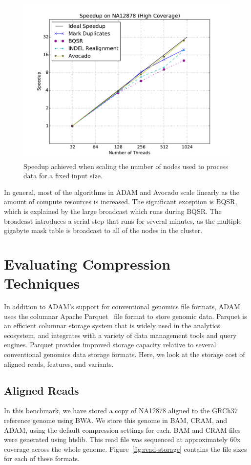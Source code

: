 \documentclass[phd]{ucbthesis}
\begin{document}
\begin{figure}[h]
  \begin{center}
    \includegraphics[width=0.6\linewidth]{graphs/speedup.pdf}
  \end{center}
  \caption{Speedup achieved when scaling the number of nodes used to process
    data for a fixed input size.}
  \label{fig:speedup}
\end{figure}

In general, most of the algorithms in ADAM and Avocado scale linearly as the
amount of compute resources is increased. The significant exception is BQSR,
which is explained by the large broadcast which runs during BQSR. The broadcast
introduces a serial step that runs for several minutes, as the multiple gigabyte
mask table is broadcast to all of the nodes in the cluster.

\section{Evaluating Compression Techniques}
\label{sec:compression}

In addition to ADAM's support for conventional genomics file formats, ADAM uses
the columnar Apache Parquet~\cite{parquet} file format to store genomic data.
Parquet is an efficient columnar storage system that is widely used in the
analytics ecosystem, and integrates with a variety of data management tools and
query engines. Parquet provides improved storage capacity relative to several
conventional genomics data storage formats. Here, we look at the storage cost of
aligned reads, features, and variants.

\subsection{Aligned Reads}
\label{sec:aligned-reads-storage}

In this benchmark, we have stored a copy of NA12878 aligned to the GRCh37
reference genome using BWA. We store this genome in BAM, CRAM, and ADAM, using
the default compression settings for each. BAM and CRAM files were generated
using htslib. This read file was sequenced at approximately 60x coverage across
the whole genome. Figure~\ref{fig:read-storage} contains the file sizes for each
of these formats.
\end{document}
